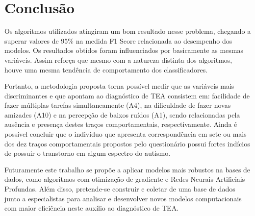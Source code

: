 \documentclass{template/sig-alternate-05-2015}
\begin{document}
    \section{Conclusão}

    Os algoritmos utilizados atingiram um bom resultado nesse
    problema, chegando a superar valores de 95\% na medida F1 Score
    relacionada ao desempenho dos modelos. Os resultados obtidos foram
    influenciados por basicamente as mesmas variáveis. Assim reforça
    que mesmo com a natureza distinta dos algoritmos, houve uma mesma
    tendência de comportamento dos classificadores.

    Portanto, a metodologia proposta torna possível medir que as
    variáveis mais discriminantes e que apontam ao diagnóstico de TEA
    consistem em: facilidade de fazer múltiplas tarefas
    simultaneamente (A4), na dificuldade de fazer novas amizades (A10)
    e na percepção de baixos ruídos (A1), sendo relacionadas pela
    ausência e presença destes traços comportamentais,
    respectivamente. Ainda é possível concluir que o indivíduo que
    apresenta correspondência em sete ou mais dos dez traços
    comportamentais propostos pelo questionário possui fortes indícios
    de possuir o transtorno em algum espectro do autismo.

    Futuramente este trabalho se propõe a aplicar modelos mais
    robustos na bases de dados, como algoritmos com otimização de
    gradiente e Redes Neurais Artificiais Profundas. Além disso,
    pretende-se construir e coletar de uma base de dados junto a
    especialistas para analisar e desenvolver novos modelos
    computacionais com maior eficiência neste auxílio ao diagnóstico
    de TEA.

    
    

  
\end{document}
